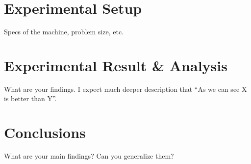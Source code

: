 \documentclass{article}
\begin{document}
\section{Experimental Setup}
Specs of the machine, problem size, etc.
\section{Experimental Result \& Analysis}
What are your findings. I expect much deeper description that ``As we can see X is better than Y''.
\section{Conclusions}
What are your main findings? Can you generalize them?



\end{document}

